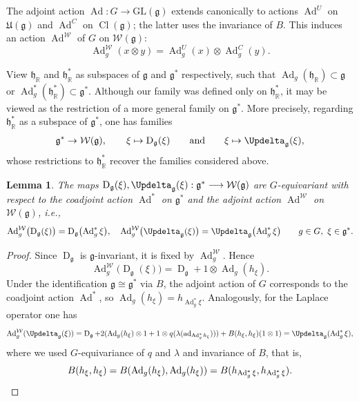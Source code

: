 \documentclass[11pt]{amsart}
\newcommand{\ad}{\operatorname{ad}}
\newcommand{\Dirac}{\operatorname{D}}
\def\Laplace{{\Updelta_{\gg}(\xi)}}
\def \Gl{{\mathrm{GL}}}
\def\RR{{\mathbb R}}
\def\Cl{{\operatorname{Cl}}}
\def\hh{{\mathfrak h}}
\def\gg{{\mathfrak{g}}}
\def\UE{{\mathfrak U}}
\newcommand{\Ad}{\operatorname{Ad}}
\theoremstyle{plain}
\newtheorem{lemma}[theorem]{Lemma}
\theoremstyle{remark}
\theoremstyle{definition}
\numberwithin{equation}{section}
\theoremstyle{remark}
\begin{document}
 The adjoint action $\Ad\colon G\to\Gl(\gg)$ extends canonically to actions $\Ad^{U}$ on $\UE(\gg)$ and $\Ad^{C}$ on $\Cl(\gg)$; the latter uses the invariance of $B$. This induces an action
$\Ad^{\mathcal W}$ of $G$ on $\mathcal{W}(\gg)$: 
\begin{equation}
\Ad^{\mathcal W}_{g}(x\otimes y)=\Ad_{g}^{U}(x)\otimes \Ad_{g}^{C}(y).
\end{equation}

View $\hh_{\RR}$ and $\hh_{\RR}^{\ast}$ as subspaces of $\gg$ and $\gg^{\ast}$ respectively, such that $\Ad_{g}(\hh_{\RR}) \subset \gg$ or $\Ad^{\ast}_{g}(\hh_{\RR}^{\ast}) \subset \gg^{\ast}$. Although our family was defined only on $\hh_{\RR}^{\ast}$, it may be viewed as the restriction of a more general family on $\gg^{\ast}$. More precisely, regarding $\hh_{\RR}^{\ast}$ as a subspace of $\gg^{\ast}$, one has families
\begin{equation}
\gg^{\ast}\to \mathcal{W}(\gg), \qquad \xi\mapsto \Dirac_{\gg}(\xi)
\qquad\text{and}\qquad
\xi\mapsto \Laplace,
\end{equation}
whose restrictions to $\hh_{\RR}^{\ast}$ recover the families considered above.

\begin{lemma} \label{lemm::invariance_family_under_G}
The maps
$
\Dirac_{\mathfrak g}(\xi), \Laplace : \mathfrak g^{\ast} \longrightarrow \mathcal W(\mathfrak g)$
are $G$-equivariant with respect to the coadjoint action $\Ad^{\ast}$ on
$\mathfrak g^{\ast}$ and the adjoint action $\Ad^{\mathcal W}$ on
$\mathcal W(\mathfrak g)$, \emph{i.e.},
\[
\Ad^{\mathcal W}_{g}\bigl(\Dirac_{\mathfrak g}(\xi)\bigr)
=
\Dirac_{\mathfrak g}\bigl(\Ad^{\ast}_{g}\xi\bigr), \quad \Ad^{\mathcal W}_{g}\bigl(\Laplace\bigr)
=
\Updelta_{\mathfrak g}\bigl(\Ad^{\ast}_{g}\xi\bigr)
\qquad g\in G,\ \xi\in\mathfrak g^{\ast}.
\]
\end{lemma}

\begin{proof}
Since $\Dirac_{\gg}$ is $\gg$-invariant, it is fixed by $\Ad^{\mathcal W}_{g}$.
Hence
\[
\Ad^{\mathcal W}_{g}\bigl(\Dirac_{\gg}(\xi)\bigr)
=\Dirac_{\gg}+1\otimes\Ad_{g}(h_{\xi}).
\]
Under the identification $\gg\cong\gg^{\ast}$ via $B$, the adjoint action of $G$
corresponds to the coadjoint action $\Ad^{\ast}$, so $\Ad_{g}(h_{\xi})=h_{\Ad^{\ast}_{g}\xi}$. Analogously, for the Laplace operator one has
\[
\Ad^{\mathcal{W}}_{g}(\Laplace)=\Dirac_{\gg}+2(\Ad_{g}(h_{\xi})\otimes 1 + 1 \otimes q(\lambda(\ad_{\Ad^{\ast}_{g}h_{\xi}})))+B(h_{\xi},h_{\xi})(1\otimes 1)=\Updelta_{\gg}(\Ad_{g}^{\ast}\xi),
\]
where we used $G$-equivariance of $q$ and $\lambda$ and invariance of $B$, that is, \[B(h_{\xi},h_{\xi})=B(\Ad_{g}(h_{\xi}),\Ad_{g}(h_{\xi}))=B(h_{\Ad_{g}^{\ast}\xi},h_{\Ad_{g}^{\ast}\xi}).\qedhere\]
\end{proof}
\end{document}

